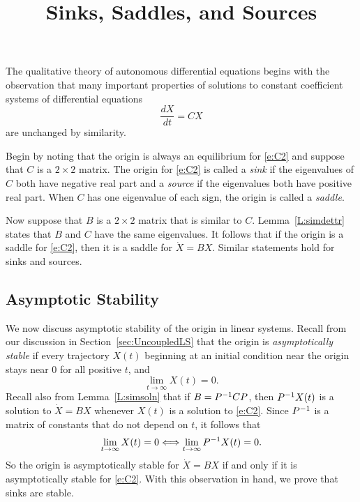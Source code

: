 \documentclass{ximera}
\title{Sinks, Saddles, and Sources}
\begin{document}
\begin{abstract}
\end{abstract}
\maketitle

 \label{S:6.7}

The qualitative theory of autonomous differential equations begins with
the observation that many important properties of solutions to constant
coefficient systems of differential equations
\begin{equation} \label{e:C2}
\frac{dX}{dt}=CX
\end{equation}
are unchanged by similarity.

Begin by noting that the origin is always an equilibrium for \eqref{e:C2}
and suppose that $C$ is a $2\times 2$ matrix.  The origin for \eqref{e:C2}
is called a {\em sink\/} if the eigenvalues of $C$ both have
negative real
part and a {\em source\/} if the eigenvalues both have
positive real part.
When $C$ has one eigenvalue of each sign, the origin is called a
{\em saddle}.

Now suppose that $B$ is a $2\times 2$ matrix that is similar to $C$.
Lemma~\ref{L:simdettr} states that $B$ and
$C$ have the same eigenvalues.  It follows that if the origin is a saddle
for \eqref{e:C2}, then it is a saddle for $\dot{X}=BX$.  Similar statements
hold for sinks and sources.

\subsection*{Asymptotic Stability}

We now discuss asymptotic stability of the origin in linear systems.
Recall from our discussion in Section~\ref{sec:UncoupledLS} 
that the origin is {\em asymptotically stable\/} 
if every trajectory $X(t)$ beginning at an initial condition near the
origin stays near $0$ for all positive $t$, and
\[
\lim_{t\to\infty}X(t) = 0.
\]
Recall also from Lemma~\ref{L:simsoln} that
if $B=P^{-1} CP$, then $P^{-1} X(t)$ is a solution to $\dot{X}=BX$ whenever
$X(t)$ is a solution to \eqref{e:C2}.  Since $P^{-1}$ is a matrix of constants
that do not depend on $t$, it follows that
\[
\lim_{t\to\infty}X(t) = 0 \Longleftrightarrow \lim_{t\to\infty}P^{-1} X(t) = 0.
\]
So the origin is asymptotically stable for $\dot{X}=BX$ if and only if it is
asymptotically stable for \eqref{e:C2}.  With this observation in hand, we
prove that sinks are stable.
\end{document}
